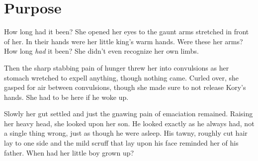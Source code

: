 \chapter*{Purpose}

How long had it been? She opened her eyes to the gaunt arms stretched in front of her. In their hands were her little king's warm hands. Were these her arms? How long \textit{had} it been? She didn't even recognize her own limbs.

Then the sharp stabbing pain of hunger threw her into convulsions as her stomach wretched to expell anything, though nothing came. Curled over, she gasped for air between convulsions, though she made sure to not release Kory's hands. She had to be here if he woke up.

Slowly her gut settled and just the gnawing pain of emaciation remained. Raising her heavy head, she looked upon her son. He looked exactly as he always had, not a single thing wrong, just as though he were asleep. His tawny, roughly cut hair lay to one side and the mild scruff that lay upon his face reminded her of his father. When had her little boy grown up?

